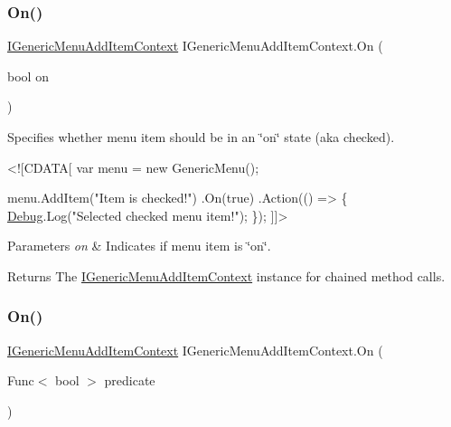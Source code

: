\subsubsection{\texorpdfstring{On()}{On()}\hspace{0.1cm}{\footnotesize\ttfamily [1/2]}}
{\footnotesize\ttfamily \hyperlink{interface_i_generic_menu_add_item_context}{I\+Generic\+Menu\+Add\+Item\+Context} I\+Generic\+Menu\+Add\+Item\+Context.\+On (\begin{DoxyParamCaption}\item[{bool}]{on }\end{DoxyParamCaption})}



Specifies whether menu item should be in an \char`\"{}on\char`\"{} state (aka checked). 


\begin{DoxyCode}
<![CDATA[
var menu = \textcolor{keyword}{new} GenericMenu();

menu.AddItem(\textcolor{stringliteral}{"Item is checked!"})
    .On(\textcolor{keyword}{true})
    .Action(() => \{
        \hyperlink{namespace_debug}{Debug}.Log(\textcolor{stringliteral}{"Selected checked menu item!"});
    \});
]]>
\end{DoxyCode}
 


\begin{DoxyParams}{Parameters}
{\em on} & Indicates if menu item is \char`\"{}on\char`\"{}.\\
\hline
\end{DoxyParams}
\begin{DoxyReturn}{Returns}
The \hyperlink{interface_i_generic_menu_add_item_context}{I\+Generic\+Menu\+Add\+Item\+Context} instance for chained method calls. 
\end{DoxyReturn}
\mbox{\label{interface_i_generic_menu_add_item_context_acd587887ffb0ad237341bbcae9c6c479}} 
\subsubsection{\texorpdfstring{On()}{On()}\hspace{0.1cm}{\footnotesize\ttfamily [2/2]}}
{\footnotesize\ttfamily \hyperlink{interface_i_generic_menu_add_item_context}{I\+Generic\+Menu\+Add\+Item\+Context} I\+Generic\+Menu\+Add\+Item\+Context.\+On (\begin{DoxyParamCaption}\item[{Func$<$ bool $>$}]{predicate }\end{DoxyParamCaption})}



